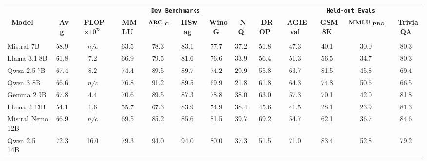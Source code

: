 \documentclass[table]{ai2style/ai2}
\begin{document}
\begin{table}[ht!]
\setlength\tabcolsep{2pt} 
\renewcommand{\arraystretch}{1.1}
\begin{center}
\begin{small}
\begin{tabular}{lcc|cccccc|cccc}
\toprule
    &&\multicolumn{7}{c}{\quad \quad \quad \quad \textbf{\texttt{Dev Benchmarks}}} & \multicolumn{4}{c}{\textbf{\texttt{Held-out Evals}}} \\
    {\textbf{\fontsize{8}{8}\selectfont~Model}} &
    {\textbf{\fontsize{8}{8}\selectfont~Avg}} &
    {\textbf{\fontsize{8}{8}\selectfont~FLOP$\times 10^{23}$}} & 
    {\textbf{\fontsize{8}{8}\selectfont~MMLU}} & 
    {$\textbf{\fontsize{8}{8}\selectfont~ARC}_\textbf{\fontsize{6}{6}\selectfont~C}$} & 
    {\textbf{\fontsize{8}{8}\selectfont~HSwag}} & 
    {\textbf{\fontsize{8}{8}\selectfont~WinoG}} & 
    {\textbf{\fontsize{8}{8}\selectfont~NQ}} & 
    {\textbf{\fontsize{8}{8}\selectfont~DROP}} & 
    {\textbf{\fontsize{8}{8}\selectfont~AGIEval}} & 
    {\textbf{\fontsize{8}{8}\selectfont~GSM8K}} & 
    {$\textbf{\fontsize{8}{8}\selectfont~MMLU}_\textbf{\fontsize{6}{6}\selectfont~PRO}$} &
    {\textbf{\fontsize{8}{8}\selectfont~TriviaQA}} 
    \\
\midrule
\rowcolor{midgrey} 
\multicolumn{13}{c}{\textbf{Open-weights models 7-14B Parameters}} \\
\rowcolor{lightgrey} Mistral 7B & 58.9 & \textit{n/a} & 63.5 & 78.3 & 83.1 & 77.7 & 37.2 & 51.8 & 47.3 & 40.1 & 30.0 & 80.3 \\
\rowcolor{lightgrey} Llama 3.1 8B & 61.8 & 7.2 & 66.9 & 79.5 & 81.6 & 76.6 & 33.9 & 56.4 & 51.3 & 56.5 & 34.7 & 80.3 \\
\rowcolor{lightgrey} Qwen 2.5 7B & 67.4 & 8.2 & 74.4 & 89.5 & 89.7 & 74.2 & 29.9 & 55.8 & 63.7 & 81.5 & 45.8 & 69.4 \\
\rowcolor{lightgrey} Qwen 3 8B & 66.6 & \emph{n/c} & 76.8 & 91.2 & 89.5 & 69.9 & 21.8 & 61.8 & 64.3 & 74.8 & 50.6 & 66.5 \\
\rowcolor{lightgrey} Gemma 2 9B & 67.8 & 4.4 & 70.6 & 89.5 & 87.3 & 78.8 & 38.0 & 63.0 & 57.3 & 70.1 & 42.0 & 81.8 \\
\rowcolor{lightgrey} Llama 2 13B & 54.1 & 1.6 & 55.7 & 67.3 & 83.9 & 74.9 & 38.4 & 45.6 & 41.5 & 28.1 & 23.9 & 81.3 \\
\rowcolor{lightgrey} Mistral Nemo 12B & 66.9 & \textit{n/a} & 69.5 & 85.2 & 85.6 & 81.5 & 39.7 & 69.2 & 54.7 & 62.1 & 36.7 & 84.6 \\
\rowcolor{lightgrey} Qwen 2.5 14B & 72.3 & 16.0 & 79.3 & 94.0 & 94.0 & 80.0 & 37.3 & 51.5 & 71.0 & 83.4 & 52.8 & 79.2 \\

\end{tabular}
\end{small}
\end{center}
\end{table}
\end{document}
